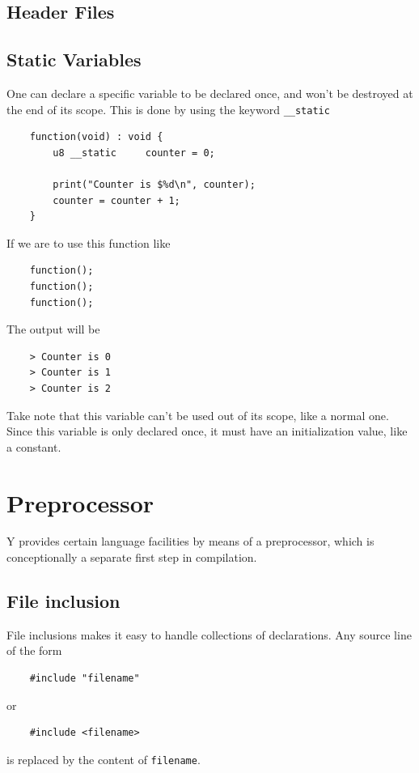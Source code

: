 \documentclass{scrartcl}
\begin{document}
        \subsection{Header Files}
        \subsection{Static Variables}
            One can declare a specific variable to be declared once, and won't
            be destroyed at the end of its scope. This is done by using the
            keyword \texttt{\_\_static}
            \begin{lstlisting}
    function(void) : void {
        u8 __static     counter = 0;

        print("Counter is $%d\n", counter);
        counter = counter + 1;
    }
            \end{lstlisting}
            If we are to use this function like
            \begin{lstlisting}
    function();
    function();
    function();
            \end{lstlisting}
            The output will be
            \begin{lstlisting}
    > Counter is 0
    > Counter is 1
    > Counter is 2
            \end{lstlisting}
            Take note that this variable can't be used out of its scope, like
            a normal one. Since this variable is only declared once, it must have
            an initialization value, like a constant.
    \section{Preprocessor}
        Y provides certain language facilities by means of a preprocessor, which
        is conceptionally a separate first step in compilation.
        \subsection{File inclusion}
            File inclusions makes it easy to handle collections of declarations.
            Any source line of the form
            \begin{lstlisting}
    #include "filename"
            \end{lstlisting}
            or
            \begin{lstlisting}
    #include <filename>
            \end{lstlisting}
            is replaced by the content of \texttt{filename}.
\end{document}
